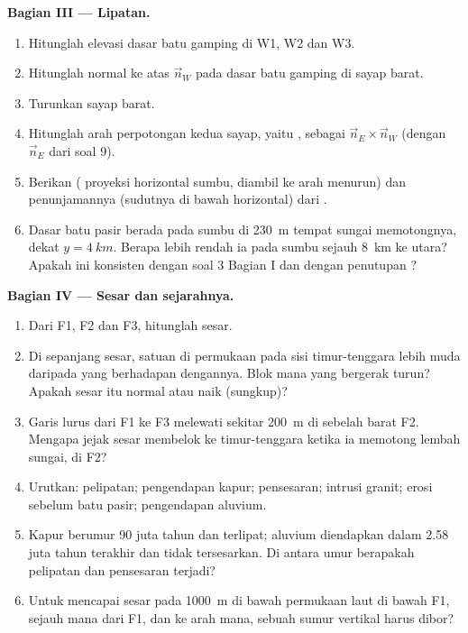 \begin{problem}
\medskip
\noindent\textbf{Bagian III --- Lipatan.}
\begin{enumerate}[resume]
  \item Hitunglah elevasi dasar batu gamping di W1, W2 dan W3.
  \item Hitunglah normal ke atas $\vec n_W$ pada dasar batu gamping di sayap barat.
  \item Turunkan  sayap barat.
  \item Hitunglah arah perpotongan kedua sayap, yaitu , sebagai $\vec n_E \times \vec n_W$ (dengan $\vec n_E$ dari soal 9).
  \item Berikan  ( proyeksi horizontal sumbu, diambil ke arah menurun) dan penunjamannya (sudutnya di bawah horizontal) dari .
  \item Dasar batu pasir berada pada sumbu di \qty{230}{m} tempat sungai memotongnya, dekat $y = \qty{4}{km}$. Berapa lebih rendah ia pada sumbu sejauh \qty{8}{km} ke utara? Apakah ini konsisten dengan soal 3 Bagian I dan dengan penutupan ?
\end{enumerate}

\medskip
\noindent\textbf{Bagian IV --- Sesar dan sejarahnya.}
\begin{enumerate}[resume]
  \item Dari F1, F2 dan F3, hitunglah  sesar.
  \item Di sepanjang sesar, satuan di permukaan pada sisi timur-tenggara lebih muda daripada yang berhadapan dengannya. Blok mana yang bergerak turun? Apakah sesar itu normal atau naik (sungkup)?
  \item Garis lurus dari F1 ke F3 melewati sekitar \qty{200}{m} di sebelah barat F2. Mengapa jejak sesar membelok ke timur-tenggara ketika ia memotong lembah sungai, di F2?
  \item Urutkan: pelipatan; pengendapan kapur; pensesaran; intrusi granit; erosi sebelum batu pasir; pengendapan aluvium.
  \item Kapur berumur 90 juta tahun dan terlipat; aluvium diendapkan dalam 2.58 juta tahun terakhir dan tidak tersesarkan. Di antara umur berapakah pelipatan dan pensesaran terjadi?
  \item Untuk mencapai sesar pada \qty{1000}{m} di bawah permukaan laut di bawah F1, sejauh mana dari F1, dan ke arah mana, sebuah sumur vertikal harus dibor?
\end{enumerate}
\end{problem}
